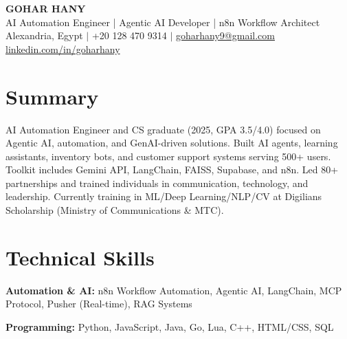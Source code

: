 \documentclass[11pt,a4paper]{article}
\begin{document}
\begin{center}
    {\LARGE\bfseries GOHAR HANY}\\[4pt]
    AI Automation Engineer | Agentic AI Developer | n8n Workflow Architect\\[4pt]
    Alexandria, Egypt $|$ +20 128 470 9314 $|$ \href{mailto:goharhany9@gmail.com}{goharhany9@gmail.com}\\[2pt]
    \href{https://linkedin.com/in/goharhany}{linkedin.com/in/goharhany}
\end{center}

\vspace{8pt}

\section*{Summary}

AI Automation Engineer and CS graduate (2025, GPA 3.5/4.0) focused on Agentic AI, automation, and GenAI-driven solutions. Built AI agents, learning assistants, inventory bots, and customer support systems serving 500+ users. Toolkit includes Gemini API, LangChain, FAISS, Supabase, and n8n. Led 80+ partnerships and trained individuals in communication, technology, and leadership. Currently training in ML/Deep Learning/NLP/CV at Digilians Scholarship (Ministry of Communications \& MTC).

\section*{Technical Skills}

\textbf{Automation \& AI:} n8n Workflow Automation, Agentic AI, LangChain, MCP Protocol, Pusher (Real-time), RAG Systems

\vspace{4pt}

\textbf{Programming:} Python, JavaScript, Java, Go, Lua, C++, HTML/CSS, SQL

\vspace{4pt}
\end{document}
